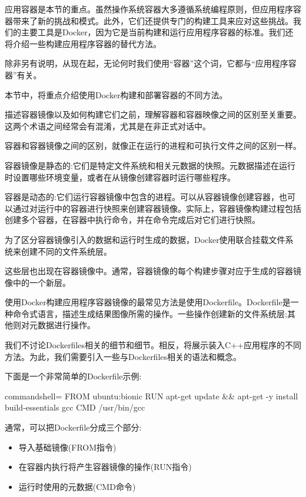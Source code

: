 
应用容器是本节的重点。虽然操作系统容器大多遵循系统编程原则，但应用程序容器带来了新的挑战和模式。此外，它们还提供专门的构建工具来应对这些挑战。我们的主要工具是Docker，因为它是当前构建和运行应用程序容器的标准。我们还将介绍一些构建应用程序容器的替代方法。

除非另有说明，从现在起，无论何时我们使用“容器”这个词，它都与“应用程序容器”有关。

本节中，将重点介绍使用Docker构建和部署容器的不同方法。


描述容器镜像以及如何构建它们之前，理解容器和容器映像之间的区别至关重要。这两个术语之间经常会有混淆，尤其是在非正式对话中。

容器和容器镜像之间的区别，就像正在运行的进程和可执行文件之间的区别一样。

容器镜像是静态的:它们是特定文件系统和相关元数据的快照。元数据描述在运行时设置哪些环境变量，或者在从镜像创建容器时运行哪些程序。

容器是动态的:它们运行容器镜像中包含的进程。可以从容器镜像创建容器，也可以通过对运行中的容器进行快照来创建容器镜像。实际上，容器镜像构建过程包括创建多个容器，在容器中执行命令，并在命令完成后对它们进行快照。

为了区分容器镜像引入的数据和运行时生成的数据，Docker使用联合挂载文件系统来创建不同的文件系统层。

这些层也出现在容器镜像中。通常，容器镜像的每个构建步骤对应于生成的容器镜像中的一个新层。


使用Docker构建应用程序容器镜像的最常见方法是使用Dockerfile。Dockerfile是一种命令式语言，描述生成结果图像所需的操作。一些操作创建新的文件系统层;其他则对元数据进行操作。

我们不讨论Dockerfiles相关的细节和细节。相反，将展示装入C++应用程序的不同方法。为此，我们需要引入一些与Dockerfiles相关的语法和概念。

下面是一个非常简单的Dockerfile示例:

\begin{tcblisting}{commandshell={}}
FROM ubuntu:bionic
RUN apt-get update && apt-get -y install build-essentials gcc
CMD /usr/bin/gcc
\end{tcblisting}

通常，可以把Dockerfile分成三个部分:

\begin{itemize}
\item 
导入基础镜像(FROM指令)

\item 
在容器内执行将产生容器镜像的操作(RUN指令)

\item 
运行时使用的元数据(CMD命令)
\end{itemize}

